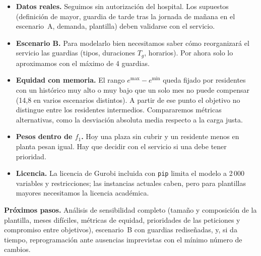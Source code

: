 \documentclass[10pt,a4paper]{article}
\begin{document}
\begin{itemize}
  \item \textbf{Datos reales.} Seguimos sin autorización del hospital. Los supuestos (definición de mayor, guardia de tarde tras la jornada de mañana en el escenario~A, demanda, plantilla) deben validarse con el servicio.
  \item \textbf{Escenario B.} Para modelarlo bien necesitamos saber cómo reorganizará el servicio las guardias (tipos, duraciones $T_g$, horarios). Por ahora solo lo aproximamos con el máximo de 4 guardias.
  \item \textbf{Equidad con memoria.} El rango $e^{\max}-e^{\min}$ queda fijado por residentes con un histórico muy alto o muy bajo que un solo mes no puede compensar (14,8 en varios escenarios distintos). A partir de ese punto el objetivo no distingue entre los residentes intermedios. Compararemos métricas alternativas, como la desviación absoluta media respecto a la carga justa.
  \item \textbf{Pesos dentro de $f_1$.} Hoy una plaza sin cubrir y un residente menos en planta pesan igual. Hay que decidir con el servicio si una debe tener prioridad.
  \item \textbf{Licencia.} La licencia de Gurobi incluida con \texttt{pip} limita el modelo a 2\,000 variables y restricciones; las instancias actuales caben, pero para plantillas mayores necesitamos la licencia académica.
\end{itemize}

\textbf{Próximos pasos.} Análisis de sensibilidad completo (tamaño y composición de la plantilla, meses difíciles, métricas de equidad, prioridades de las peticiones y compromiso entre objetivos), escenario~B con guardias rediseñadas, y, si da tiempo, reprogramación ante ausencias imprevistas con el mínimo número de cambios.
\end{document}
